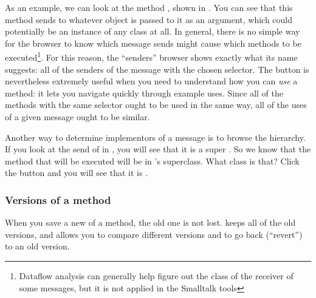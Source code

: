 \documentclass[a4paper,10pt,twoside]{book}
\begin{document}
As an example, we can look at the method , shown in .
You can see that this method sends  to whatever object is passed to it as an argument, which could potentially be an instance of any class at all.
In general, there is no simple way for the browser to know which message sends might cause which methods to be executed\footnote{Dataflow analysis can generally help figure out the class of the receiver of some messages, but it is not applied in the Smalltalk tools}.
For this reason,  the ``senders'' browser shows exactly what its name suggests: all of the senders of the message with the chosen selector.
The  button is nevertheless extremely useful when you need to understand how you can \emph{use} a method: it lets you navigate quickly through example uses.
Since all of the methods with the same selector ought to be used in the same way, all of the uses of a given message ought to be similar.

Another way to determine implementors of a message is to browse the hierarchy. If you look at the send of  in , you will see that it is a super .
So we know that the method that will be executed will be in 's superclass.
What class is that?
Click the  button and you will see that it is .


\subsubsection{Versions of a method}
\label{sec:versions}

When you save a new  of a method, the old one is not lost.
\sq keeps all of the old versions, and allows you to compare different versions and to go back (``revert'') to an old version.
\end{document}
